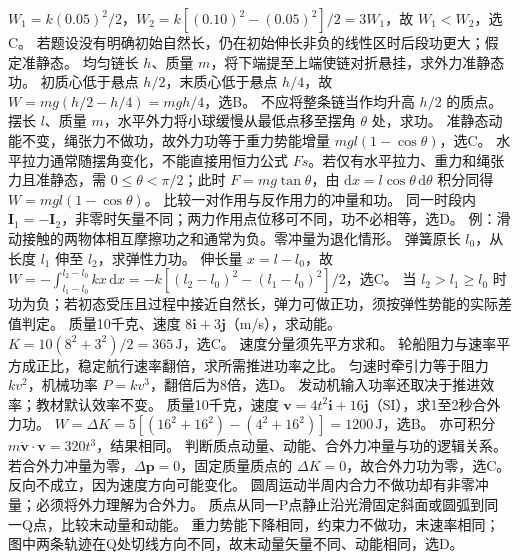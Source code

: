 \workings $W_1=k(0.05)^2/2$，$W_2=k[(0.10)^2-(0.05)^2]/2=3W_1$，故 $W_1<W_2$，选C。
\crosscheck 若题设没有明确初始自然长，仍在初始伸长非负的线性区时后段功更大；假定准静态。
\problemtext 均匀链长 $h$、质量 $m$，将下端提至上端使链对折悬挂，求外力准静态功。
\workings 初质心低于悬点 $h/2$，末质心低于悬点 $h/4$，故 $W=mg(h/2-h/4)=mgh/4$，选B。
\crosscheck 不应将整条链当作均升高 $h/2$ 的质点。
\problemtext 摆长 $l$、质量 $m$，水平外力将小球缓慢从最低点移至摆角 $\theta$ 处，求功。
\workings 准静态动能不变，绳张力不做功，故外力功等于重力势能增量 $mgl(1-\cos\theta)$，选C。
\crosscheck 水平拉力通常随摆角变化，不能直接用恒力公式 $Fs$。若仅有水平拉力、重力和绳张力且准静态，需 $0\le\theta<\pi/2$；此时 $F=mg\tan\theta$，由 $\mathrm dx=l\cos\theta\,\mathrm d\theta$ 积分同得 $W=mgl(1-\cos\theta)$。
\problemtext 比较一对作用与反作用力的冲量和功。
\workings 同一时段内 $\bm I_1=-\bm I_2$，非零时矢量不同；两力作用点位移可不同，功不必相等，选D。
\crosscheck 例：滑动接触的两物体相互摩擦功之和通常为负。零冲量为退化情形。
\problemtext 弹簧原长 $l_0$，从长度 $l_1$ 伸至 $l_2$，求弹性力功。
\workings 伸长量 $x=l-l_0$，故 $W=-\int_{l_1-l_0}^{l_2-l_0}kx\,\mathrm dx=-k[(l_2-l_0)^2-(l_1-l_0)^2]/2$，选C。
\crosscheck 当 $l_2>l_1\ge l_0$ 时功为负；若初态受压且过程中接近自然长，弹力可做正功，须按弹性势能的实际差值判定。
\problemtext 质量10千克、速度 $8\bm i+3\bm j$（m/s），求动能。
\workings $K=10(8^2+3^2)/2=365\,\mathrm J$，选C。
\crosscheck 速度分量须先平方求和。
\problemtext 轮船阻力与速率平方成正比，稳定航行速率翻倍，求所需推进功率之比。
\workings 匀速时牵引力等于阻力 $kv^2$，机械功率 $P=kv^3$，翻倍后为8倍，选D。
\crosscheck 发动机输入功率还取决于推进效率；教材默认效率不变。
\problemtext 质量10千克，速度 $\bm v=4t^2\bm i+16\bm j$（SI），求1至2秒合外力功。
\workings $W=\Delta K=5[(16^2+16^2)-(4^2+16^2)]=1200\,\mathrm J$，选B。
\crosscheck 亦可积分 $m\dot{\bm v}\cdot\bm v=320t^3$，结果相同。
\problemtext 判断质点动量、动能、合外力冲量与功的逻辑关系。
\workings 若合外力冲量为零，$\Delta\bm p=0$，固定质量质点的 $\Delta K=0$，故合外力功为零，选C。反向不成立，因为速度方向可能变化。
\crosscheck 圆周运动半周内合力不做功却有非零冲量；必须将外力理解为合外力。
\problemtext 质点从同一P点静止沿光滑固定斜面或圆弧到同一Q点，比较末动量和动能。
\workings 重力势能下降相同，约束力不做功，末速率相同；图中两条轨迹在Q处切线方向不同，故末动量矢量不同、动能相同，选D。
